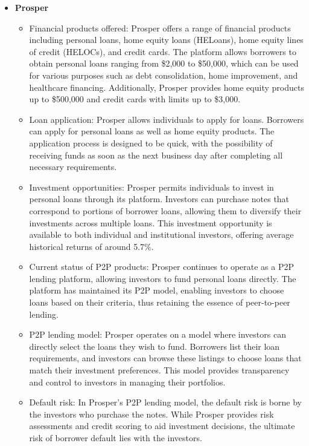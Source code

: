 \documentclass{article}
\begin{document}
\begin{itemize}
    \item \textbf{Prosper}
        \begin{itemize}
            \item Financial products offered: Prosper offers a range of financial products including personal loans, home equity loans (HELoans), home equity lines of credit (HELOCs), and credit cards. The platform allows borrowers to obtain personal loans ranging from \$2,000 to \$50,000, which can be used for various purposes such as debt consolidation, home improvement, and healthcare financing. Additionally, Prosper provides home equity products up to \$500,000 and credit cards with limits up to \$3,000.
            \item Loan application: Prosper allows individuals to apply for loans. Borrowers can apply for personal loans as well as home equity products. The application process is designed to be quick, with the possibility of receiving funds as soon as the next business day after completing all necessary requirements.
            \item Investment opportunities: Prosper permits individuals to invest in personal loans through its platform. Investors can purchase notes that correspond to portions of borrower loans, allowing them to diversify their investments across multiple loans. This investment opportunity is available to both individual and institutional investors, offering average historical returns of around 5.7\%.
            \item Current status of P2P products: Prosper continues to operate as a P2P lending platform, allowing investors to fund personal loans directly. The platform has maintained its P2P model, enabling investors to choose loans based on their criteria, thus retaining the essence of peer-to-peer lending.
            \item P2P lending model: Prosper operates on a model where investors can directly select the loans they wish to fund. Borrowers list their loan requirements, and investors can browse these listings to choose loans that match their investment preferences. This model provides transparency and control to investors in managing their portfolios.
            \item Default risk: In Prosper’s P2P lending model, the default risk is borne by the investors who purchase the notes. While Prosper provides risk assessments and credit scoring to aid investment decisions, the ultimate risk of borrower default lies with the investors.
        \end{itemize}  


\end{itemize}
\end{document}
